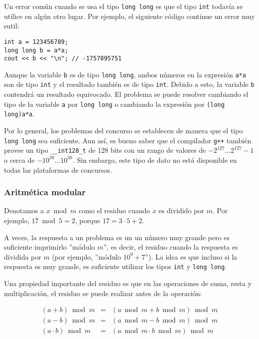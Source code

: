 Un error común cuando se usa el tipo \texttt{long long}
es que el tipo \texttt{int} todavía se utilice 
en algún otro lugar.
Por ejemplo, el siguiente código continue
un error muy sutil:

\begin{lstlisting}
int a = 123456789;
long long b = a*a;
cout << b << "\n"; // -1757895751
\end{lstlisting}

Aunque la variable \texttt{b} es de tipo \texttt{long long},
ambos números en la expresión \texttt{a*a}
son de tipo \texttt{int} y el resultado
también es de tipo \texttt{int}.
Debido a esto, la variable \texttt{b}
contendrá un resultado equivocado.
El problema se puede resolver cambiando el tipo
de la variable \texttt{a} por \texttt{long long} o
cambiando la expresión por \texttt{(long long)a*a}.

Por lo general, los problemas del concurso se establecen de manera que
el tipo \texttt{long long} sea suficiente.
Aun así, es bueno saber que
el compilador \texttt{g++} también provee
un tipo \texttt{\_\_int128\_t} de 128 bits
con un rango de valores de
$-2^{127} \ldots 2^{127}-1$ o cerca de $-10^{38} \ldots 10^{38}$.
Sin embargo, este tipo de dato no está disponible en todas las plataformas de concursos.

\subsubsection{Aritmética modular}


Denotamos a $x \bmod m$ como el residuo
cuando $x$ es dividido por $m$.
Por ejemplo, $17 \bmod 5 = 2$,
porque $17 = 3 \cdot 5 + 2$.

A veces, la respuesta a un problema es un
un número muy grande pero es suficiente
imprimirlo ''módulo $m$'', es decir,
el residuo cuando la respuesta es dividida por $m$
(por ejemplo, ''módulo $10^9+7$'').
La idea es que incluso si la respuesta
es muy grande,
es suficiente utilizar los tipos
\texttt{int} y \texttt{long long}.

Una propiedad importante del residuo es que
en las operaciones de suma, resta y multiplicación,
el residuo se puede realizar antes de la operación:

\[
\begin{array}{rcr}
(a+b) \bmod m & = & (a \bmod m + b \bmod m) \bmod m \\
(a-b) \bmod m & = & (a \bmod m - b \bmod m) \bmod m \\
(a \cdot b) \bmod m & = & (a \bmod m \cdot b \bmod m) \bmod m
\end{array}
\]

